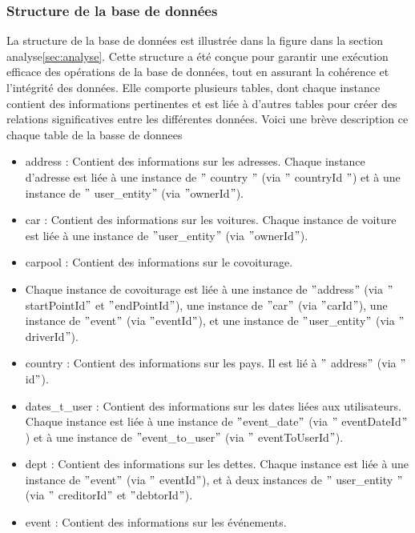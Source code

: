 \subsubsection{Structure de la base de données}
La structure de la base de données est illustrée dans la figure dans la section analyse\ref{sec:analyse}.
Cette structure a été conçue pour garantir une exécution efficace des opérations de la base de données, tout en assurant la cohérence et l'intégrité des données.
Elle comporte plusieurs tables, dont chaque instance contient des informations pertinentes et est liée à d'autres tables pour créer des relations significatives entre les différentes données.
Voici une brève description ce chaque table de la basse de donnees
\begin{itemize}
    \item address : Contient des informations sur les adresses.
    Chaque instance d'adresse est liée à une instance de \("\) country \("\) (via \("\) countryId \("\)) et à une instance de \("\) user\_entity\("\) (via \("\)ownerId\("\)).
    \item car : Contient des informations sur les voitures.
    Chaque instance de voiture est liée à une instance de \("\)user\_entity\("\) (via \("\)ownerId\("\)).
    \item carpool : Contient des informations sur le covoiturage.
    \item Chaque instance de covoiturage est liée à une instance de \("\)address\("\) (via \("\)startPointId\("\) et \("\)endPointId\("\)), une instance de \("\)car\("\) (via \("\)carId\("\)),
    une instance de \("\)event\("\) (via \("\)eventId\("\)), et une instance de \("\)user\_entity\("\) (via \("\)driverId\("\)).
    \item country : Contient des informations sur les pays.
    Il est lié à \("\) address\("\) (via \("\)id\("\)).
    \item  dates\_t\_user : Contient des informations sur les dates liées aux utilisateurs.
    Chaque instance est liée à une instance de \("\)event\_date\("\) (via \("\) eventDateId\("\)) et à une instance de \("\)event\_to\_user\("\) (via \("\) eventToUserId\("\)).
    \item dept : Contient des informations sur les dettes.
    Chaque instance est liée à une instance de \("\)event\("\) (via \("\) eventId\("\)), et à deux instances de \("\) user\_entity \("\) (via \("\) creditorId\("\) et \("\)debtorId\("\)).
    \item event : Contient des informations sur les événements.

\end{itemize}
